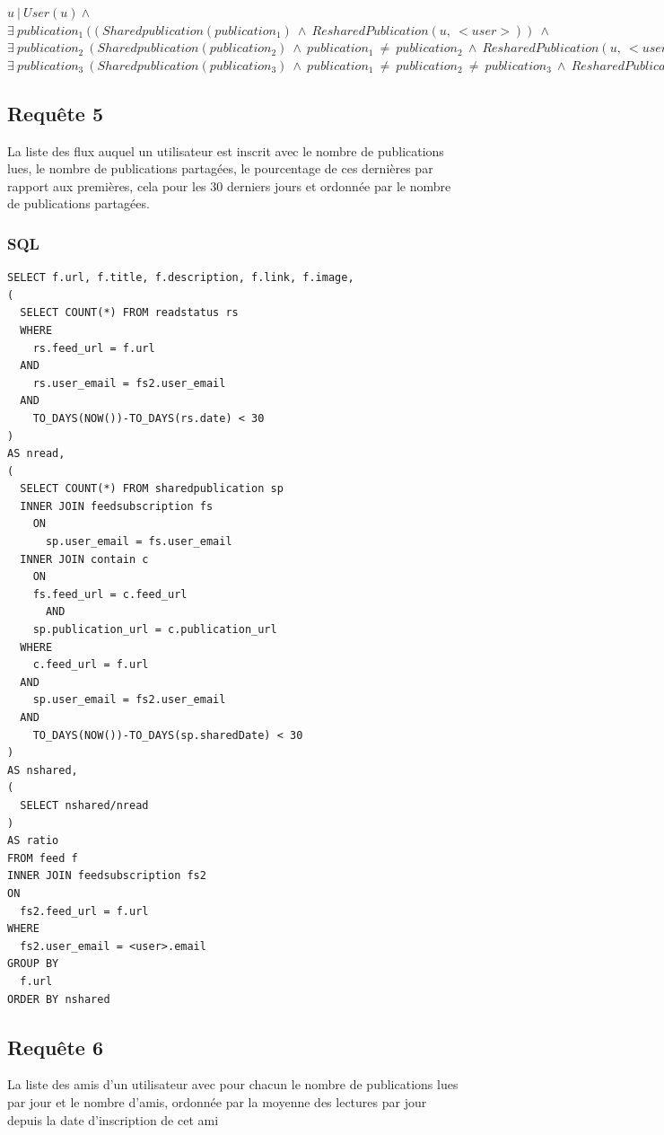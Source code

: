 \documentclass[a4paper,10pt]{article}
\begin{document}
       $u\ |\ User(u) \wedge$ \\
       $\exists \ publication_1 \ ((Sharedpublication(publication_1) \ \wedge \ ResharedPublication(u, \ <user>)) \ \wedge$ \\
       $\exists \ publication_2 \ (Sharedpublication(publication_2) \ \wedge \ publication_1 \ \neq \ publication_2 \ \wedge \ ResharedPublication(u, \ <user>)) \ \wedge$ \\
       $\exists \ publication_3 \ (Sharedpublication(publication_3) \ \wedge \ publication_1 \ \neq \ publication_2 \ \neq \ publication_3 \ \wedge  \ ResharedPublication(u, \ <user>)))$
\clearpage
\subsection{Requête 5}
La liste des flux auquel un utilisateur est inscrit avec le nombre de publications lues, le nombre de publications
partagées, le pourcentage de ces dernières par rapport aux premières, cela pour les 30 derniers jours et ordonnée
par le nombre de publications partagées.
\subsubsection{SQL}
\begin{lstlisting}
SELECT f.url, f.title, f.description, f.link, f.image, 
(
  SELECT COUNT(*) FROM readstatus rs 
  WHERE 
    rs.feed_url = f.url
  AND 
    rs.user_email = fs2.user_email
  AND 
    TO_DAYS(NOW())-TO_DAYS(rs.date) < 30
)
AS nread,
(
  SELECT COUNT(*) FROM sharedpublication sp
  INNER JOIN feedsubscription fs 
    ON 
      sp.user_email = fs.user_email
  INNER JOIN contain c 
    ON 
	fs.feed_url = c.feed_url
      AND 
	sp.publication_url = c.publication_url
  WHERE 
    c.feed_url = f.url
  AND 
    sp.user_email = fs2.user_email
  AND 
    TO_DAYS(NOW())-TO_DAYS(sp.sharedDate) < 30
) 
AS nshared,
( 
  SELECT nshared/nread 
)
AS ratio 
FROM feed f
INNER JOIN feedsubscription fs2 
ON 
  fs2.feed_url = f.url
WHERE 
  fs2.user_email = <user>.email 
GROUP BY 
  f.url 
ORDER BY nshared
\end{lstlisting}
\clearpage
\subsection{Requête 6}
La liste des amis d’un utilisateur avec pour chacun le nombre de publications lues par jour et le nombre
d’amis, ordonnée par la moyenne des lectures par jour depuis la date d’inscription de cet ami
\end{document}
